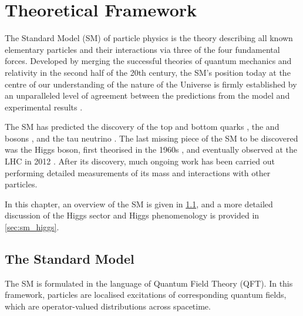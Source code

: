 \chapter{Theoretical Framework}\label{chap:theory}

The Standard Model (SM) of particle physics is the theory describing all known elementary particles and their interactions via three of the four fundamental forces.
Developed by merging the successful theories of quantum mechanics and relativity in the second half of the 20th century, the SM's position today at the centre of our understanding of the nature of the Universe is firmly established by an unparalleled level of agreement between the predictions from the model and experimental results \cite{morel2020determination,sailer2022measurement}.

The SM has predicted the discovery of the top and bottom quarks \cite{CDF:1995wbb,D0:1995jca,Herb:1977ek}, the \Wboson and \Zboson bosons \cite{UA1:1983crd}, and the tau neutrino \cite{DONUT:2000fbd}.
The last missing piece of the SM to be discovered was the Higgs boson, first theorised in the 1960s \cite{Englert:1964et,Higgs:1964pj,Guralnik:1964eu}, and eventually observed at the LHC in 2012 \cite{HIGG-2012-27,CMS-HIG-12-028}.
After its discovery, much ongoing work has been carried out performing detailed measurements of its mass and interactions with other particles.

In this chapter, an overview of the SM is given in \cref{sec:standard_model}, and a more detailed discussion of the Higgs sector and Higgs phenomenology is provided in \cref{sec:sm_higgs}.

\section{The Standard Model}\label{sec:standard_model}

The SM is formulated in the language of Quantum Field Theory (QFT).
In this framework, particles are localised excitations of corresponding quantum fields, which are operator-valued distributions across spacetime.

